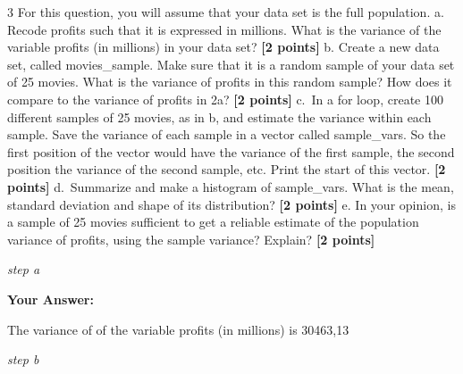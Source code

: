 \documentclass[
]{article}
\newenvironment{Shaded}{\begin{snugshade}}{\end{snugshade}}
\newcommand{\CommentTok}[1]{\textcolor[rgb]{0.56,0.35,0.01}{\textit{#1}}}
\newcommand{\DecValTok}[1]{\textcolor[rgb]{0.00,0.00,0.81}{#1}}
\newcommand{\FunctionTok}[1]{\textcolor[rgb]{0.13,0.29,0.53}{\textbf{#1}}}
\newcommand{\NormalTok}[1]{#1}
\newcommand{\OtherTok}[1]{\textcolor[rgb]{0.56,0.35,0.01}{#1}}
\newcommand{\SpecialCharTok}[1]{\textcolor[rgb]{0.81,0.36,0.00}{\textbf{#1}}}
\begin{document}
3 For this question, you will assume that your data set is the full
population. a. Recode profits such that it is expressed in millions.
What is the variance of the variable profits (in millions) in your data
set? \textbf{[2 points]} b. Create a new data set, called
movies\_sample. Make sure that it is a random sample of your data set of
25 movies. What is the variance of profits in this random sample? How
does it compare to the variance of profits in 2a? \textbf{[2 points]}
c.~In a for loop, create 100 different samples of 25 movies, as in b,
and estimate the variance within each sample. Save the variance of each
sample in a vector called sample\_vars. So the first position of the
vector would have the variance of the first sample, the second position
the variance of the second sample, etc. Print the start of this vector.
\textbf{[2 points]} d.~Summarize and make a histogram of sample\_vars.
What is the mean, standard deviation and shape of its distribution?
\textbf{[2 points]} e. In your opinion, is a sample of 25 movies
sufficient to get a reliable estimate of the population variance of
profits, using the sample variance? Explain? \textbf{[2 points]}

\emph{step a}

\begin{Shaded}
\end{Shaded}

\textbf{Your Answer:}

The variance of of the variable profits (in millions) is 30463,13

\emph{step b}

\begin{Shaded}
\end{Shaded}
\end{document}
